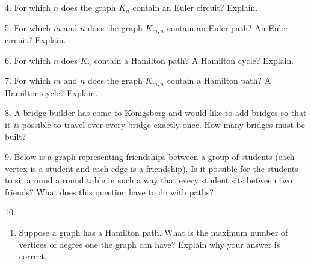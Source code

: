 \documentclass[10pt,]{book}
\theoremstyle{plain}
\theoremstyle{definition}
\numberwithin{equation}{chapter}
\newcommand{\vtx}[2]{node[fill,circle,inner sep=0pt, minimum size=4pt,label=#1:#2]{}}
\renewcommand{\v}{\vtx{above}{}}
\begin{document}
\begin{exerciselist}
\par\smallskip
\item[4.]\hypertarget{exercise-306}{}
        For which \(n\) does the graph \(K_n\) contain an Euler circuit? Explain.
\par\smallskip
\item[5.]\hypertarget{exercise-307}{}
        For which \(m\) and \(n\) does the graph \(K_{m,n}\) contain an Euler path? An Euler circuit? Explain.
\par\smallskip
\item[6.]\hypertarget{exercise-308}{}
        For which \(n\) does \(K_n\) contain a Hamilton path? A Hamilton cycle? Explain.
\par\smallskip
\item[7.]\hypertarget{exercise-309}{}
        For which \(m\) and \(n\) does the graph \(K_{m,n}\) contain a Hamilton path? A Hamilton cycle? Explain.
\par\smallskip
\item[8.]\hypertarget{exercise-310}{}
        A bridge builder has come to Königsberg and would like to add bridges so that it \emph{is} possible to travel over every bridge exactly once. How many bridges must be built?
\par\smallskip
\item[9.]\hypertarget{exercise-311}{}
        Below is a graph representing friendships between a group of students (each vertex is a student and each edge is a friendship). Is it possible for the students to sit around a round table in such a way that every student sits between two friends? What does this question have to do with paths?
\leavevmode%
\begin{figure}
\centering
{
}
\end{figure}
\par\smallskip
\item[10.]\hypertarget{exercise-312}{}
        \leavevmode%
\begin{enumerate}[label=(\alph*)]
\item\hypertarget{li-803}{}
          Suppose a graph has a Hamilton path. What is the maximum number of vertices of degree one the graph can have? Explain why your answer is correct.


\end{enumerate}
\end{exerciselist}
\end{document}
